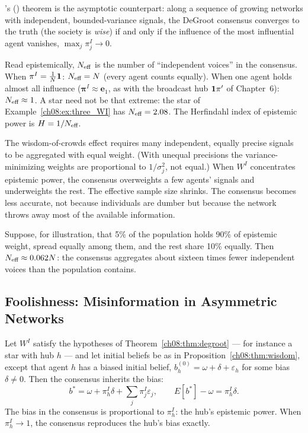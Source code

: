 \documentclass[../structural_economics_book.tex]{subfiles}
\begin{document}
\citeauthor{golub2010naive}'s (\citeyear{golub2010naive}) theorem is the asymptotic counterpart: along a sequence of growing networks with independent, bounded-variance signals, the DeGroot consensus converges to the truth (the society is \textit{wise}) if and only if the influence of the most influential agent vanishes, $\max_j \pi^{I}_j \to 0$.

\begin{remark}\label{ch08:def:neff}
Read epistemically, $N_{\text{eff}}$ is the number of ``independent voices'' in the consensus. When $\pi^I = \frac{1}{N}\mathbf{1}$: $N_{\text{eff}} = N$ (every agent counts equally). When one agent holds almost all influence ($\boldsymbol{\pi}^I \approx \mathbf{e}_1$, as with the broadcast hub $\mathbf{1}\pi'$ of Chapter~6): $N_{\text{eff}} \approx 1$. A star need not be that extreme: the star of Example~\ref{ch08:ex:three_WI} has $N_{\text{eff}} = 2.08$. The Herfindahl index of epistemic power is $H = 1/N_{\text{eff}}$.
\end{remark}

\begin{intuition}
The wisdom-of-crowds effect requires many independent, equally precise signals to be aggregated with equal weight. (With unequal precisions the variance-minimizing weights are proportional to $1/\sigma_j^2$, not equal.) When $W^I$ concentrates epistemic power, the consensus overweights a few agents' signals and underweights the rest. The effective sample size shrinks. The consensus becomes less accurate, not because individuals are dumber but because the network throws away most of the available information.

Suppose, for illustration, that 5\% of the population holds 90\% of epistemic weight, spread equally among them, and the rest share 10\% equally. Then $N_{\text{eff}} \approx 0.062N$: the consensus aggregates about sixteen times fewer independent voices than the population contains.
\end{intuition}


\subsection{Foolishness: Misinformation in Asymmetric Networks}

\begin{proposition}\label{ch08:prop:misinfo}
Let $W^I$ satisfy the hypotheses of Theorem~\ref{ch08:thm:degroot} --- for instance a star with hub $h$ --- and let initial beliefs be as in Proposition~\ref{ch08:thm:wisdom}, except that agent $h$ has a biased initial belief, $b_h^{(0)} = \omega + \delta + \varepsilon_h$ for some bias $\delta \neq 0$. Then the consensus inherits the bias:
\begin{equation}
b^* = \omega + \pi^I_h \delta + \sum_j \pi^I_j \varepsilon_j, \qquad E[b^*] - \omega = \pi^I_h\delta .
\end{equation}
The bias in the consensus is proportional to $\pi^I_h$: the hub's epistemic power. When $\pi^I_h \to 1$, the consensus reproduces the hub's bias exactly.
\end{proposition}
\end{document}

